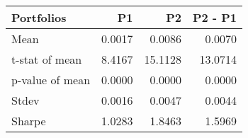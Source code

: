 \begin{tabular}{lrrr}
\toprule
Portfolios & P1 & P2 & P2 - P1 \\
\midrule
Mean & 0.0017 & 0.0086 & 0.0070 \\
t-stat of mean & 8.4167 & 15.1128 & 13.0714 \\
p-value of mean & 0.0000 & 0.0000 & 0.0000 \\
Stdev & 0.0016 & 0.0047 & 0.0044 \\
Sharpe & 1.0283 & 1.8463 & 1.5969 \\
\bottomrule
\end{tabular}
